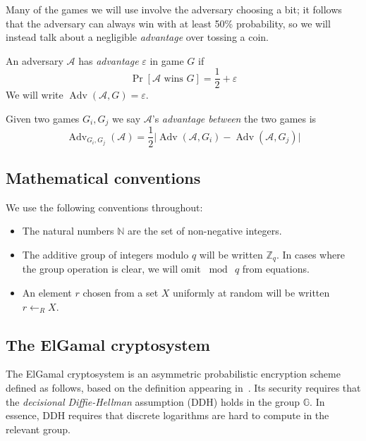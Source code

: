 \documentclass[12pt,a4paper]{article}
\DeclareMathOperator{\Adv}{\text{Adv}}
\theoremstyle{definition}
\begin{document}
Many of the games we will use involve the adversary choosing a bit; it follows that the adversary can always win with at least 50\% probability, so we will instead talk about a negligible \textit{advantage} over tossing a coin. 
\begin{definition}[Advantage]
    An adversary $\mathcal{A}$ has \textit{advantage} $\varepsilon$ in game $G$ if
    $$\Pr\left[\mathcal{A}\text{ wins }G\right]=\frac{1}{2} + \varepsilon$$
    We will write $\Adv(\mathcal{A}, G)=\varepsilon$.

    Given two games $G_i, G_j$ we say $\mathcal{A}$'s \textit{advantage between} the two games is
    $$\Adv_{G_i, G_j}(\mathcal{A}) = \frac{1}{2}
    \Big|
        \Adv(\mathcal{A}, G_i)
         -
        \Adv(\mathcal{A}, G_j)
    \Big|$$
\end{definition}

\subsection{Mathematical conventions}
We use the following conventions throughout:
\begin{itemize}
    \item The natural numbers $\mathbb{N}$ are the set of non-negative integers.
    \item The additive group of integers modulo $q$ will be written $\mathbb{Z}_q$. In cases where the group operation is clear, we will omit $\bmod\ q$ from equations.
    \item An element $r$ chosen from a set $X$ uniformly at random will be written $r\gets_R X$.
\end{itemize}
\subsection{The ElGamal cryptosystem}\label{sec-elgamal}
The ElGamal cryptosystem is an asymmetric probabilistic encryption scheme defined as follows, based on the definition appearing in~\cite{katz2014introduction}. Its security requires that the \textit{decisional Diffie-Hellman} assumption (DDH) holds in the group $\mathbb{G}$. In essence, DDH requires that discrete logarithms are hard to compute in the relevant group.
\end{document}

